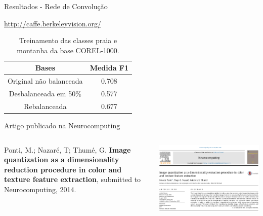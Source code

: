 \documentclass{beamer}
\begin{document}
\begin{frame}{Resultados - Rede de Convolução}
\begin{table}
\url{http://caffe.berkeleyvision.org/}
\caption{Treinamento das classes praia e montanha da base COREL-1000.}
  \begin{tabular}{c|c}
    Bases    &   Medida F1 \\ \hline
    Original não balanceada     &   0.708  \\
    Desbalanceada em 50\% &   0.577  \\
    Rebalanceada  &   0.677  \\
  \end{tabular}
\end{table}
\end{frame}
\begin{frame}{Artigo publicado na Neurocomputing}

\begin{columns}
  \begin{column}{0.5\textwidth}
  \centering
\begin{block}{}
\justifying
\tiny{
Ponti, M.; Nazaré, T; Thumé, G. \textbf{Image quantization as a dimensionality reduction procedure in color and texture feature extraction}, submitted to Neurocomputing, 2014.}
\end{block}
  \end{column}
  \begin{column}{0.5\textwidth}
  \centering
    \includegraphics[width=0.9\linewidth]{figuras/artigo.png}
  \end{column}
\end{columns}
\end{frame}
\end{document}
